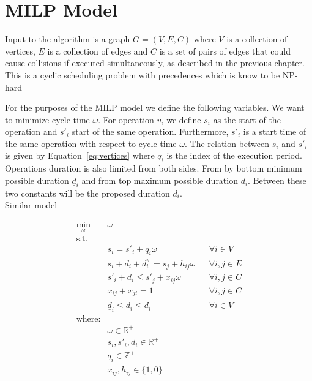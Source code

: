 \chapter{MILP Model}
\label{ch:milp_model}
\graphicspath{{chapters/MILP_Model/}}

Input to the algorithm is a graph \(G=(V, E, C)\) where \(V\) is a collection of vertices, $E$ is a collection of edges and $C$ is a set of pairs of edges that could cause collisions if executed simultaneously, as described in the previous chapter. \\

This is a cyclic scheduling problem with precedences which is know to be NP-hard \cite{SuchaCyclicSchedulingFPGA}

For the purposes of the MILP model we define the following variables. We want to minimize cycle time $\omega$. For operation $v_i$ we define $s_i$ as the start of the operation and $s'_i$ start of the same operation.
Furthermore, $s'_i$ is a start time of the same operation with respect to cycle time $\omega$. The relation between $s_i$ and $s'_i$ is given by Equation~\ref{eq:vertices} where $q_i$ is the index of the execution period.
Operations duration is also limited from both sides. From by bottom minimum possible duration $\underline{d}_i$ and from top maximum possible duration $\overline{d}_i$. Between these two constants will be the proposed duration $d_i$. \\



Similar model 

\begin{align}
    \min_\omega\text{ } & \omega  \\
    \text{s.t. } \\
        & s_i  =  s'_i + q_i \omega & & \forall i \in V     \label{eq:vertices}\\
        & s_i + d_i + d^w_i =  s_j + h_{ij} \omega & & \forall i, j \in E \\
        & s'_i + d_i  \leq  s'_j + x_{ij} \omega & & \forall i, j \in C \\
        & x_{ij} + x_{ji}  =  1 & & \forall i, j \in C \\
        & \underline{d}_i \leq  d_i \leq \overline{d}_i & & \forall i \in V \\
    \text{where:} \\
        & \omega \in \mathbb{R}^+\\
        & s_i, s'_i, d_i \in \mathbb{R}^+\\
        & q_i \in \mathbb{Z}^+\\
        & x_{ij}, h_{ij} \in \{1, 0\} 
\end{align}




